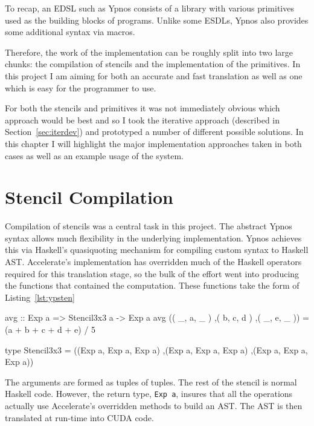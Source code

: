 \documentclass[12pt,a4paper,twoside]{scrbook}
\begin{document}
To recap, an EDSL such as Ypnos consists of a library with various primitives
used as the building blocks of programs. Unlike some ESDLs, Ypnos also provides
some additional syntax via macros.

Therefore, the work of the implementation can be roughly split into two large
chunks: the compilation of stencils and the implementation of the primitives. In
this project I am aiming for both an accurate and fast translation as well as
one which is easy for the programmer to use.

For both the stencils and primitives it was not immediately obvious which
approach would be best and so I took the iterative approach (described in
Section~\ref{sec:iterdev}) and prototyped a number of different possible
solutions. In this chapter I will highlight the major implementation approaches
taken in both cases as well as an example usage of the system.

\section{Stencil Compilation}

Compilation of stencils was a central task in this project. The abstract Ypnos
syntax allows much flexibility in the underlying implementation.  Ypnos achieves
this via Haskell's quasiquoting mechanism\cite{mainland2007} for compiling
custom syntax to Haskell AST. Accelerate's implementation has overridden much of
the Haskell operators required for this translation stage, so the bulk of the
effort went into producing the functions that contained the computation. These
functions take the form of Listing~\ref{lst:ypsten}


\begin{hflisting}[label={lst:ypsten}, caption=The ``average'' stencil defined
  using Accelerate's syntax.]
avg :: Exp a => Stencil3x3 a -> Exp a
avg (( _, a, _ )
    ,( b, c, d )
    ,( _, e, _ )) = (a + b + c + d + e) / 5

type Stencil3x3 = ((Exp a, Exp a, Exp a)
                  ,(Exp a, Exp a, Exp a)
                  ,(Exp a, Exp a, Exp a))
\end{hflisting}

The arguments are formed as tuples of tuples. The rest of the stencil is normal
Haskell code. However, the return type, \texttt{Exp a}, insures that all the
operations actually use Accelerate's overridden methods to build an AST. The AST
is then translated at run-time into CUDA code.
\end{document}
